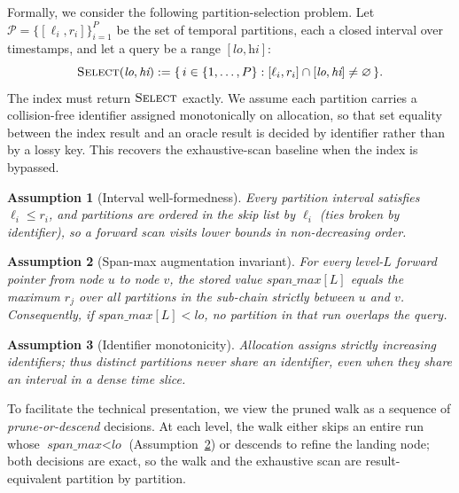 \documentclass{article}
\newtheorem{assumption}{Assumption}
\begin{document}
Formally, we consider the following partition-selection problem. Let
$\mathcal{P} = \{[\ell_i, r_i]\}_{i=1}^{P}$ be the set of temporal partitions, each a
closed interval over timestamps, and let a query be a range $[\textit{lo}, \textit{hi}]$:
\begin{equation}
\textsc{Select}(\textit{lo}, \textit{hi}) := \{\, i \in \{1,\dots,P\} : [\ell_i, r_i] \cap [\textit{lo}, \textit{hi}] \neq \varnothing \,\}.
\end{equation}
The index must return $\textsc{Select}$ exactly. We assume each partition carries a
collision-free identifier assigned monotonically on allocation, so that set equality
between the index result and an oracle result is decided by identifier rather than by
a lossy key. This recovers the exhaustive-scan baseline when the index is bypassed.

\begin{assumption}[Interval well-formedness]
\label{asm:wellformed}
Every partition interval satisfies $\ell_i \leq r_i$, and partitions are ordered in the
skip list by $\ell_i$ (ties broken by identifier), so a forward scan visits lower
bounds in non-decreasing order.
\end{assumption}

\begin{assumption}[Span-max augmentation invariant]
\label{asm:spanmax}
For every level-$L$ forward pointer from node $u$ to node $v$, the stored value
$\textit{span\_max}[L]$ equals the maximum $r_j$ over all partitions in the sub-chain
strictly between $u$ and $v$. Consequently, if $\textit{span\_max}[L] < \textit{lo}$,
no partition in that run overlaps the query.
\end{assumption}

\begin{assumption}[Identifier monotonicity]
\label{asm:id}
Allocation assigns strictly increasing identifiers; thus distinct partitions never
share an identifier, even when they share an interval in a dense time slice.
\end{assumption}

To facilitate the technical presentation, we view the pruned walk as a sequence of
\emph{prune-or-descend} decisions. At each level, the walk either skips an entire run
whose $\textit{span\_max} < \textit{lo}$ (Assumption~\ref{asm:spanmax}) or descends to
refine the landing node; both decisions are exact, so the walk and the exhaustive scan
are result-equivalent partition by partition.
\end{document}
